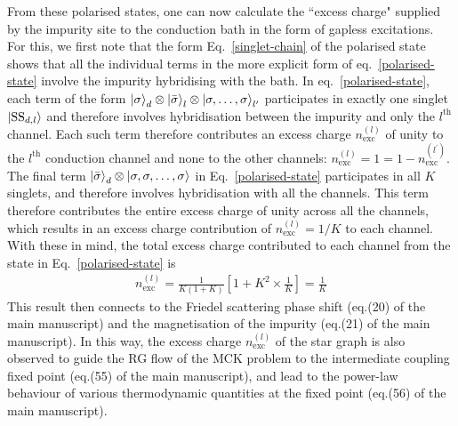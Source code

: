 \documentclass[12pt]{iopart}
\begin{document}
From these polarised states, one can now calculate the ``excess charge" supplied by the impurity site to the conduction bath in the form of gapless excitations. For this, we first note that the form Eq.~\ref{singlet-chain} of the polarised state shows that all the individual terms in the more explicit form of eq.~\ref{polarised-state} involve the impurity hybridising with the bath. In eq.~\ref{polarised-state}, each term of the form \(\ket{\sigma}_d\otimes\ket{\bar\sigma}_l\otimes\ket{\sigma,\ldots,\sigma}_{l^\prime}\) participates in exactly one singlet \(\ket{\text{SS}_{d,l}}\) and therefore involves hybridisation between the impurity and only the \(l^\text{th}\) channel. Each such term therefore contributes an excess charge \(n_\text{exc}^{(l)}\) of unity to the \(l^\text{th}\) conduction channel and none to the other channels: \(n_\text{exc}^{(l)} = 1 = 1 - n_\text{exc}^{(l^\prime)}\). The final term \(\ket{\bar\sigma}_d\otimes \ket{\sigma,\sigma,\ldots,\sigma}\) in Eq.~\ref{polarised-state} participates in all \(K\) singlets, and therefore involves hybridisation with all the channels. This term therefore contributes the entire excess charge of unity across all the channels, which results in an excess charge contribution of \(n_\text{exc}^{(l)}=1/K\) to each channel. With these in mind, the total excess charge contributed to each channel from the state in Eq.~\ref{polarised-state} is
\begin{eqnarray}
	n_\text{exc}^{(l)} = \frac{1}{K(1+K)}\left[1 + K^2 \times \frac{1}{K}\right] = \frac{1}{K}
\end{eqnarray}
This result then connects to the Friedel scattering phase shift (eq.(20) of the main manuscript) and the magnetisation of the impurity (eq.(21) of the main manuscript). In this way, the excess charge $n_\text{exc}^{(l)}$ of the star graph is also observed to guide the RG flow of the MCK problem to the intermediate coupling fixed point (eq.(55) of the main manuscript), and lead to the power-law behaviour of various thermodynamic quantities at the fixed point (eq.(56) of the main manuscript).
\end{document}
